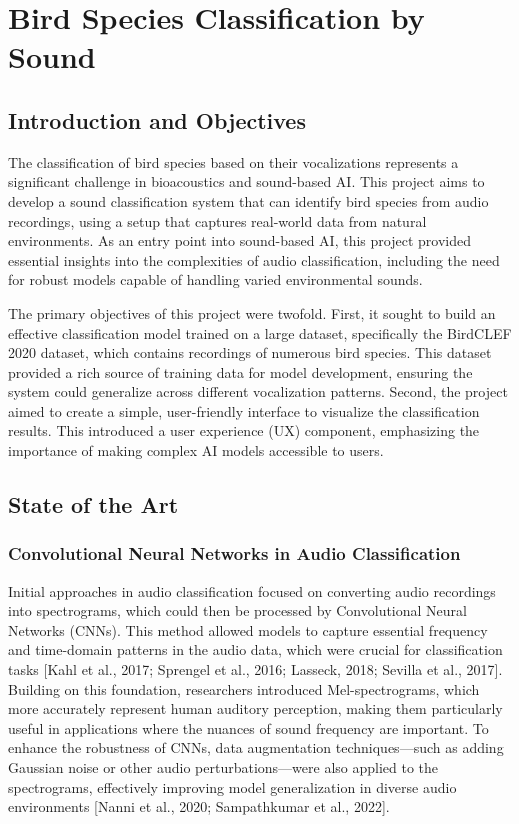 \section{Bird Species Classification by Sound}

\subsection{Introduction and Objectives}
The classification of bird species based on their vocalizations represents a significant challenge in bioacoustics and sound-based AI. This project aims to develop a sound classification system that can identify bird species from audio recordings, using a setup that captures real-world data from natural environments. As an entry point into sound-based AI, this project provided essential insights into the complexities of audio classification, including the need for robust models capable of handling varied environmental sounds.

The primary objectives of this project were twofold. First, it sought to build an effective classification model trained on a large dataset, specifically the BirdCLEF 2020 dataset, which contains recordings of numerous bird species. This dataset provided a rich source of training data for model development, ensuring the system could generalize across different vocalization patterns. Second, the project aimed to create a simple, user-friendly interface to visualize the classification results. This introduced a user experience (UX) component, emphasizing the importance of making complex AI models accessible to users.

\subsection{State of the Art}

\subsubsection{Convolutional Neural Networks in Audio Classification}

Initial approaches in audio classification focused on converting audio recordings into spectrograms, which could then be processed by Convolutional Neural Networks (CNNs). This method allowed models to capture essential frequency and time-domain patterns in the audio data, which were crucial for classification tasks [Kahl et al., 2017; Sprengel et al., 2016; Lasseck, 2018; Sevilla et al., 2017]. Building on this foundation, researchers introduced Mel-spectrograms, which more accurately represent human auditory perception, making them particularly useful in applications where the nuances of sound frequency are important. To enhance the robustness of CNNs, data augmentation techniques—such as adding Gaussian noise or other audio perturbations—were also applied to the spectrograms, effectively improving model generalization in diverse audio environments [Nanni et al., 2020; Sampathkumar et al., 2022].

